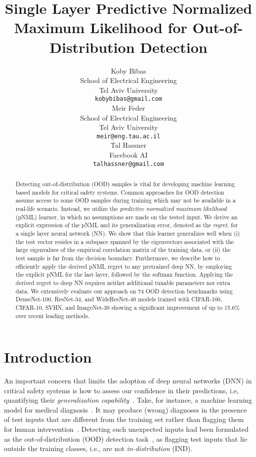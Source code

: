 \documentclass{article}
\title{Single Layer Predictive Normalized Maximum Likelihood for Out-of-Distribution Detection}
\author{Koby Bibas \\
    School of Electrical Engineering\\
    Tel Aviv University\\
    \texttt{kobybibas@gmail.com} \\
\And
    Meir Feder \\
    School of Electrical Engineering\\
    Tel Aviv University\\
    \texttt{meir@eng.tau.ac.il} \\
   \AND
   Tal Hassner \\
   Facebook AI \\
   \texttt{talhassner@gmail.com} \\
}
\begin{document}
\maketitle

\begin{abstract}
Detecting out-of-distribution (OOD) samples is vital for developing machine learning based models for critical safety systems. Common approaches for OOD detection assume access to some OOD samples during training which may not be available in a real-life scenario. Instead, we utilize the {\em predictive normalized maximum likelihood} (pNML) learner, in which no assumptions are made on the tested input. We derive an explicit expression of the pNML and its generalization error, denoted as the {\em regret}, for a single layer neural network (NN). We show that this learner generalizes well when (i) the test vector resides in a subspace spanned by the eigenvectors associated with the large eigenvalues of the empirical correlation matrix of the training data, or (ii) the test sample is far from the decision boundary. Furthermore, we describe how to efficiently apply the derived pNML regret to any pretrained deep NN, by employing the explicit pNML for the last layer, followed by the softmax function. Applying the derived regret to deep NN requires neither additional tunable parameters nor extra data. We extensively evaluate our approach on 74 OOD detection benchmarks using DenseNet-100, ResNet-34, and WideResNet-40 models trained with CIFAR-100, CIFAR-10, SVHN, and ImageNet-30 showing a significant improvement of up to 15.6\% over recent leading methods.
\end{abstract}


\section{Introduction}
\label{sec:intro}

An important concern that limits the adoption of deep neural networks (DNN) in critical safety systems is how to assess our confidence in their predictions, i.e, quantifying their \textit{generalization capability}~\citep{DBLP:conf/bmvc/KaufmanBBCH19,willers2020safety}.
Take, for instance, a machine learning model for medical diagnosis~\citep{bibas2021learning}. 
It may produce (wrong) diagnoses in the presence of test inputs that are different from the training set rather than flagging them for human intervention~\citep{singh2021uncertainty}. 
Detecting such unexpected inputs had been formulated as the out-of-distribution (OOD) detection task~\citep{hendrycks17baseline}, as flagging test inputs that lie outside the training classes, i.e., are not \textit{in-distribution} (IND).
\end{document}
